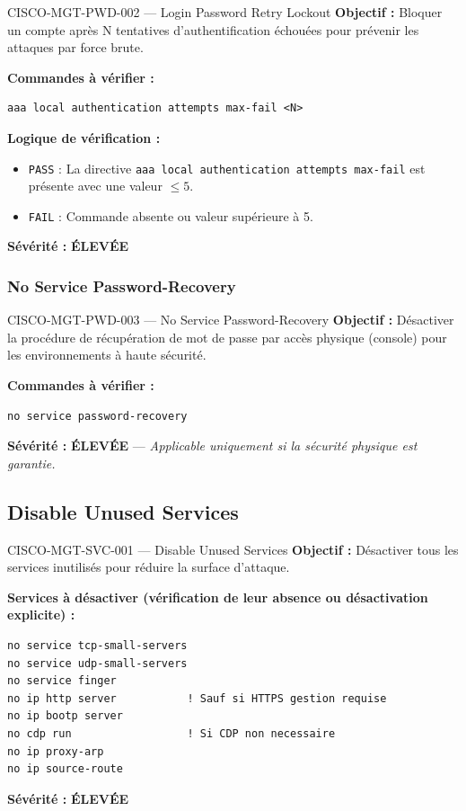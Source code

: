 \documentclass[12pt, a4paper]{report}
\begin{document}
\begin{rulebox}{CISCO-MGT-PWD-002 — Login Password Retry Lockout}
  \textbf{Objectif :} Bloquer un compte après N tentatives d'authentification échouées pour prévenir les attaques par force brute.

  \textbf{Commandes à vérifier :}
  \begin{lstlisting}
aaa local authentication attempts max-fail <N>
  \end{lstlisting}

  \textbf{Logique de vérification :}
  \begin{itemize}
    \item \texttt{PASS} : La directive \texttt{aaa local authentication attempts max-fail} est présente avec une valeur $\leq 5$.
    \item \texttt{FAIL} : Commande absente ou valeur supérieure à 5.
  \end{itemize}

  \textbf{Sévérité :} \textcolor{accentOrange}{\textbf{ÉLEVÉE}}
\end{rulebox}

\subsubsection{No Service Password-Recovery}

\begin{rulebox}{CISCO-MGT-PWD-003 — No Service Password-Recovery}
  \textbf{Objectif :} Désactiver la procédure de récupération de mot de passe par accès physique (console) pour les environnements à haute sécurité.

  \textbf{Commandes à vérifier :}
  \begin{lstlisting}
no service password-recovery
  \end{lstlisting}

  \textbf{Sévérité :} \textcolor{accentOrange}{\textbf{ÉLEVÉE}} — \textit{Applicable uniquement si la sécurité physique est garantie.}
\end{rulebox}

\subsection{Disable Unused Services}

\begin{rulebox}{CISCO-MGT-SVC-001 — Disable Unused Services}
  \textbf{Objectif :} Désactiver tous les services inutilisés pour réduire la surface d'attaque.

  \textbf{Services à désactiver (vérification de leur absence ou désactivation explicite) :}
  \begin{lstlisting}
no service tcp-small-servers
no service udp-small-servers
no service finger
no ip http server           ! Sauf si HTTPS gestion requise
no ip bootp server
no cdp run                  ! Si CDP non necessaire
no ip proxy-arp
no ip source-route
  \end{lstlisting}

  \textbf{Sévérité :} \textcolor{accentOrange}{\textbf{ÉLEVÉE}}
\end{rulebox}
\end{document}
